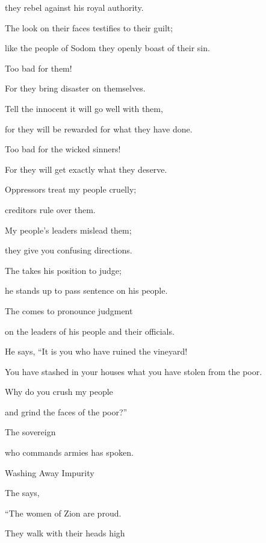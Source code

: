 {\par }{\Q they rebel against his royal authority.
\par }{\Q {}The look
on their faces
testifies
to their guilt;

\par }{\Q like the people of Sodom
they openly
boast of their sin.
\par }{\Q Too bad for
them!

\par }{\Q For they
bring disaster on themselves.
\par }{\Q {}Tell
the innocent
it will go well
with them,

\par }{\Q for
they will be rewarded
for what they have done.
\par }{\Q {}Too bad
for the wicked
sinners!
\par }{\Q For
they will get exactly what they deserve.
\par }{\Q {}Oppressors
treat my people
cruelly;
\par }{\Q creditors
rule over
them.

\par }{\Q My people’s leaders
mislead
them;
\par }{\Q they give you confusing
directions.
\par }{\Q {}The
{}
takes
his position
to judge;
\par }{\Q he stands
up to pass sentence
on his people.
\par }{\Q {}The
{}
comes
to pronounce judgment
\par }{\Q on the leaders
of his people
and their officials.
\par }{\Q He says, “It is you
who have ruined
the vineyard!

\par }{\Q You have stashed
in your houses
what you have stolen from the poor.
\par }{\Q {}Why do you crush
my people
\par }{\Q and grind
the faces
of the poor?”

\par }{\Q The sovereign

{}
who commands armies has spoken.
\par }{\SH Washing Away Impurity
\par }{\Q {}The
{}
says,
\par }{\Q “The women
of Zion
are proud.
\par }{\Q They walk
with their
heads high

}
